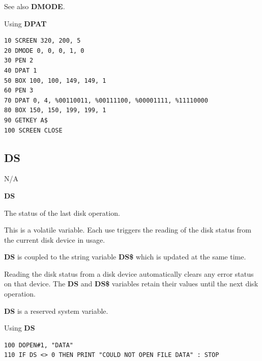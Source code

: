 \begin{description}[leftmargin=2cm,style=nextline]
                  See also {\bf DMODE}.

\item [Example:]  Using {\bf DPAT}

\begin{tcolorbox}[colback=black,coltext=white]
\verbatimfont{\codefont}
\begin{verbatim}
10 SCREEN 320, 200, 5
20 DMODE 0, 0, 0, 1, 0
30 PEN 2
40 DPAT 1
50 BOX 100, 100, 149, 149, 1
60 PEN 3
70 DPAT 0, 4, %00110011, %00111100, %00001111, %11110000
80 BOX 150, 150, 199, 199, 1
90 GETKEY A$
100 SCREEN CLOSE
\end{verbatim}
\end{tcolorbox}
\end{description}


\newpage
\subsection{DS}
\begin{description}[leftmargin=2cm,style=nextline]
\item [Token:]    N/A

\item [Format:]   {\bf DS}

\item [Usage:]    The status of the last disk operation.

                  This is a volatile variable. Each use triggers the reading of the disk status from the current disk device in usage.

                  {\bf DS} is coupled to the string variable {\bf DS\$} which is updated at the same time.

                  Reading the disk status from a disk device automatically clears any error status on that device. The {\bf DS} and {\bf DS\$} variables retain their values until the next disk operation.

\item [Remarks:]  {\bf DS} is a reserved system variable.

\item [Example:]  Using {\bf DS}

\begin{tcolorbox}[colback=black,coltext=white]
\verbatimfont{\codefont}
\begin{verbatim}
100 DOPEN#1, "DATA"
110 IF DS <> 0 THEN PRINT "COULD NOT OPEN FILE DATA" : STOP
\end{verbatim}
\end{tcolorbox}
\end{description}

